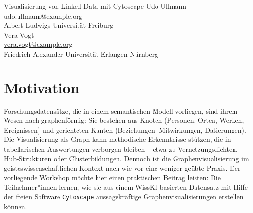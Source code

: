 \graphicspath{{abstracts/workshops/05-linked-data-visualisierung/img/}{img/}}

\begin{beitrag}{Visualisierung von Linked Data mit Cytoscape}{%
Udo Ullmann\, \\
\small \href{mailto:udo.ullmann@example.org}{udo.ullmann@example.org} \\
\small Albert-Ludwigs-Universität Freiburg \\[0.5cm]
Vera Vogt\, \\
\small \href{mailto:vera.vogt@example.org}{vera.vogt@example.org} \\
\small Friedrich-Alexander-Universität Erlangen-Nürnberg
}

\begin{abstract}
Der Workshop zeigt, wie semantische Forschungsdaten aus WissKI mit der freien Graphenvisualisierungssoftware Cytoscape -- gewählt wegen ihrer Stabilität, Anpassbarkeit und SPARQL-fähigen Eingangsbrücke -- explorativ ausgewertet und publikationsreif aufbereitet werden können. Nach konzeptionellen Grundlagen zu geeigneten Forschungsfragen und Designentscheidungen (Layout, Farbcodierung, Filterstrategien) importieren die Teilnehmer*innen einen WissKI-Datensatz via SPARQL und experimentieren iterativ mit der Visualisierung. Das übergeordnete Ziel ist die methodische Reflexion: Eine Graphenvisualisierung ist ein argumentatives Werkzeug, dessen Aussagekraft begründet werden muss.
\end{abstract}

\section{Motivation}
Forschungsdatensätze, die in einem semantischen Modell vorliegen, sind ihrem Wesen nach graphenförmig: Sie bestehen aus Knoten (Personen, Orten, Werken, Ereignissen) und gerichteten Kanten (Beziehungen, Mitwirkungen, Datierungen). Die Visualisierung als Graph kann methodische Erkenntnisse stützen, die in tabellarischen Auswertungen verborgen bleiben -- etwa zu Vernetzungsdichten, Hub-Strukturen oder Clusterbildungen. Dennoch ist die Graphenvisualisierung im geisteswissenschaftlichen Kontext nach wie vor eine weniger geübte Praxis. Der vorliegende Workshop möchte hier einen praktischen Beitrag leisten: Die Teilnehmer*innen lernen, wie sie aus einem WissKI-basierten Datensatz mit Hilfe der freien Software \texttt{Cytoscape} aussagekräftige Graphenvisualisierungen erstellen können.


\end{beitrag}
